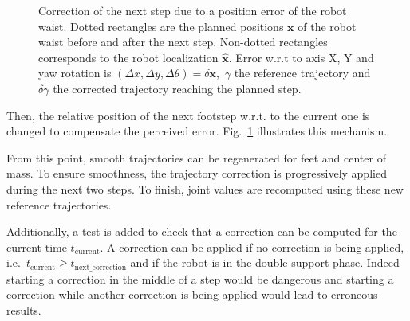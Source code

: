 \begin{figure}[ht!]
\begin{center}
  \end{center}
  \caption{Correction of the next step due to a position error of the
    robot waist. Dotted rectangles are the planned positions
    $\mathbf{x}$ of the robot waist before and after the next
    step. Non-dotted rectangles corresponds to the robot localization
    $\mathbf{\hat{x}}$. Error w.r.t to axis X, Y and yaw rotation is
    \mbox{$(\Delta x, \Delta y, \Delta \theta) = \delta \mathbf{x}$,
      $\gamma$} the reference trajectory and $\delta \gamma$ the
    corrected trajectory reaching the planned
    step. \label{fig:footstepreplan}}
\end{figure}



Then, the relative position of the next footstep w.r.t. to the current
one is changed to compensate the perceived
error. Fig.~\ref{fig:footstepreplan} illustrates this mechanism.


From this point, smooth trajectories can be regenerated for feet and
center of mass. To ensure smoothness, the trajectory correction is
progressively applied during the next two steps. To finish, joint
values are recomputed using these new reference trajectories.



Additionally, a test is added to check that a correction can be
computed for the current time $t_{\text{current}}$. A correction can
be applied if no correction is being applied,
i.e.\ \mbox{$t_{\text{current}} \geq t_{\text{next\_correction}}$} and if the
robot is in the double support phase. Indeed starting a correction in
the middle of a step would be dangerous and starting a correction
while another correction is being applied would lead to erroneous
results.


